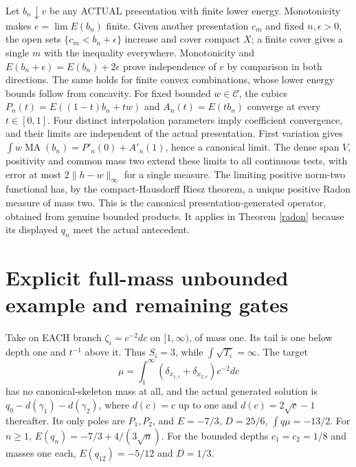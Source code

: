 \documentclass[11pt]{article}
\newcommand{\MA}{\operatorname{MA}}
\newcommand{\C}{\mathcal C}
\begin{document}
Let $b_n\downarrow v$ be any ACTUAL presentation with finite lower energy.
Monotonicity makes $e=\lim E(b_n)$ finite. Given another presentation
$c_m$ and fixed $n,\epsilon>0$, the open sets
$\{c_m<b_n+\epsilon\}$ increase and cover compact $X$; a finite cover
gives a single $m$ with the inequality everywhere. Monotonicity and
$E(b_n+\epsilon)=E(b_n)+2\epsilon$ prove independence of $e$ by comparison
in both directions. The same holds for finite convex combinations,
whose lower energy bounds follow from concavity.
For fixed bounded $w\in\C$, the cubics
$P_n(t)=E((1-t)b_n+tw)$ and $A_n(t)=E(tb_n)$ converge at every $t\in[0,1]$.
Four distinct interpolation parameters imply coefficient convergence,
and their limits are independent of the actual presentation.
First variation gives
$\int w\MA(b_n)=P'_n(0)+A'_n(1)$, hence a canonical limit.
The dense span $V$, positivity and common mass two extend these limits to
all continuous tests, with error at most $2\|h-w\|_\infty$ for a single
measure. The limiting positive norm-two functional has, by the
compact-Hausdorff Riesz theorem, a unique positive Radon measure of mass
two. This is the canonical presentation-generated operator, obtained
from genuine bounded products. It applies in Theorem \ref{radon} because
its displayed $q_n$ meet the actual antecedent.

\section*{Explicit full-mass unbounded example and remaining gates}
Take on EACH branch $\zeta_i=c^{-2}dc$ on $[1,\infty)$, of mass one.
Its tail is one below depth one and $t^{-1}$ above it. Thus $S_i=3$,
while $\int\sqrt{T_i}=\infty$. The target
\[
 \mu=\int_1^\infty(\delta_{x_{1,c}}+\delta_{x_{2,c}})c^{-2}dc
\]
has no canonical-skeleton mass at all, and the actual generated solution
is $q_0-d(\gamma_1)-d(\gamma_2)$, where $d(c)=c$ up to one and
$d(c)=2\sqrt c-1$ thereafter. Its only poles are $P_1,P_2$,
and $E=-7/3$, $D=25/6$, $\int q\mu=-13/2$.
For $n\ge1$, $E(q_n)=-7/3+4/(3\sqrt n)$.
For the bounded depths $c_1=c_2=1/8$ and masses one each,
$E(q_{12})=-5/12$ and $D=1/3$.
\end{document}

